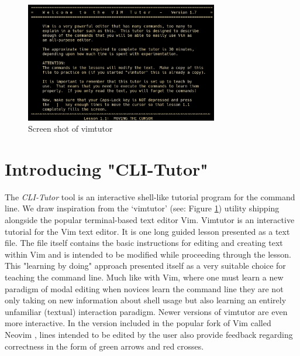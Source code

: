 \begin{figure}[htbp]
	\centering
	\includegraphics[width=0.75\textwidth]{img/vimtutor}
	\caption{Screen shot of vimtutor}
    \label{fig:vimtutor}
\end{figure}

\section{Introducing "CLI-Tutor"}

The \textit{CLI-Tutor} tool is an interactive shell-like tutorial program for
the command line. We draw inspiration from the
`vimtutor'\cite{pierce_ware_smith_moolenaar_2019} (see: Figure
\ref{fig:vimtutor}) utility shipping alongside the popular terminal-based text
editor Vim. Vimtutor is an interactive tutorial for the Vim text editor. It is
one long guided lesson presented as a text file. The file itself contains the
basic instructions for editing and creating text within Vim and is intended to
be modified while proceeding through the lesson. This "learning by doing"
approach presented itself as a very suitable choice for teaching the command
line. Much like with Vim, where one must learn a new paradigm of modal editing
when novices learn the command line they are not only taking on new information
about shell usage but also learning an entirely unfamiliar (textual)
interaction paradigm. Newer versions of vimtutor are even more interactive. In
the version included in the popular fork of Vim called Neovim
\cite{neovimHomeNeovim}, lines intended to be edited by the user also provide
feedback regarding correctness in the form of green arrows and red crosses. 

